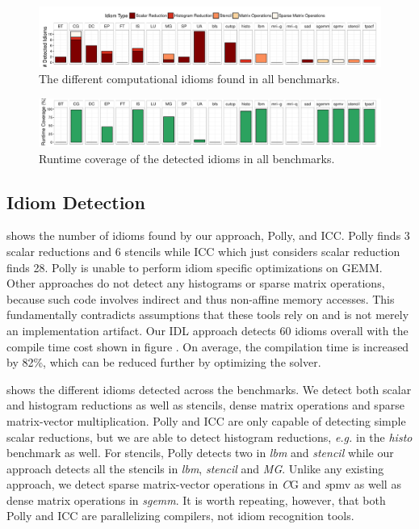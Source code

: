 \begin{figure}[t]
  \centering
  \includegraphics[width=\textwidth]{figures/asplosplots/detection.pdf}
  \caption{The different computational idioms found in all benchmarks.}
  \label{detection-figure}
\end{figure}
\begin{figure}[t]
  \centering
  \includegraphics[width=\textwidth]{figures/asplosplots/coverage.pdf}
  \caption{Runtime coverage of the detected idioms in all benchmarks.}
  \label{coverage-figure}
  \vspace{0.5em}
\end{figure}

\subsection{Idiom Detection}

     shows the number of idioms found by our approach, Polly, and ICC.
    Polly finds 3 scalar reductions and 6 stencils while ICC which just considers  scalar reduction finds 28.
    Polly is unable to perform idiom specific optimizations on GEMM.
    Other approaches do not detect any histograms or sparse matrix operations, because such code involves indirect and thus non-affine memory accesses.
    This fundamentally contradicts assumptions that these tools rely on and is not merely an implementation artifact.
    Our IDL approach detects 60 idioms overall with the compile time cost shown in figure .
    On average, the compilation time is increased by 82\%, which can be reduced further by optimizing the solver.

     shows the different idioms detected across
    the  benchmarks. We detect both scalar
    and histogram reductions as well as stencils, dense matrix operations
    and sparse matrix-vector multiplication.
    Polly and ICC are only capable of detecting simple scalar
    reductions, but we are able to detect histogram reductions, {\em e.g.} in
    the \emph{histo} benchmark as well.  For stencils, Polly detects two
    in \emph{lbm} and \emph{stencil} while our approach
    detects all the stencils in \emph{lbm}, \emph{stencil} and \emph{MG}.
    Unlike any existing approach, we detect sparse matrix-vector
    operations in {\emph CG} and {\emph spmv} as well as dense matrix
    operations in \emph{sgemm}. It is worth repeating, however, that both
    Polly and ICC are parallelizing compilers, not idiom recognition
    tools.

